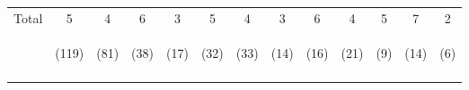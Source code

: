 \begin{tabular}{lcccccccccccc}
\noalign{\smallskip}Total & 5 & 4 & 6 & 3 & 5 & 4 & 3 & 6 & 4 & 5 & 7 & 2\\
 & \begin{footnotesize}(119)\end{footnotesize} & \begin{footnotesize}(81)\end{footnotesize} & \begin{footnotesize}(38)\end{footnotesize} & \begin{footnotesize}(17)\end{footnotesize} & \begin{footnotesize}(32)\end{footnotesize} & \begin{footnotesize}(33)\end{footnotesize} & \begin{footnotesize}(14)\end{footnotesize} & \begin{footnotesize}(16)\end{footnotesize} & \begin{footnotesize}(21)\end{footnotesize} & \begin{footnotesize}(9)\end{footnotesize} & \begin{footnotesize}(14)\end{footnotesize} & \begin{footnotesize}(6)\end{footnotesize}\\
\noalign{\smallskip}\hline\end{tabular}\\

